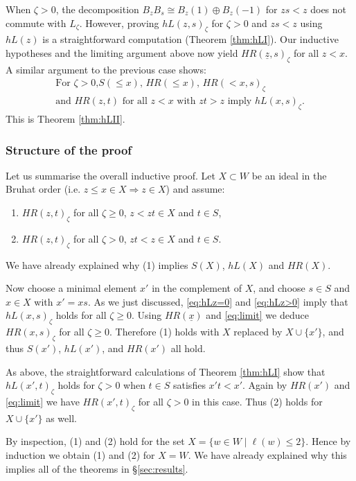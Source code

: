 \documentclass[11pt]{amsart}
\numberwithin{equation}{section}
\def\z{\zeta}
\def\un{\underline}
\theoremstyle{definition}
\theoremstyle{remark}
\begin{document}
When $\z>0$, the decomposition $B_z B_s \cong B_z(1) \oplus B_z(-1)$ for $zs < z$ does not commute with $L_\z$. However, proving $hL(z,s)_\z$ for
$\z>0$ and $zs < z$ using $hL(z)$ is a straightforward computation (Theorem \ref{thm:hLI}). Our inductive hypotheses and the limiting argument above
now yield $HR(\un{z},s)_\z$ for all $z<x$. A similar argument to the previous case shows: \begin{equation}\label{eq:hLz>0} \begin{array}{c}\text{For $\z>0$,
$S(\le\!x)$, $HR(\le\!x)$, $HR(<\! x,s)_\z$}\\\text{and $HR(z,t)$ for
all $z < x$ with $zt > z$ imply $hL(x,s)_\z$.} \end{array} \end{equation} This is Theorem \ref{thm:hLII}.

\subsubsection{Structure of the proof} \label{ss:sp}
Let us summarise the overall inductive proof. Let $X \subset W$ be an
ideal in the Bruhat order (i.e. $z \le x \in X \Rightarrow z \in X$) and assume:
\begin{enumerate}
\item $HR(z,t)_\z$ for all $\z \ge 0$, $z < zt \in X$ and $t \in S$,
\item $HR(z,t)_\z$ for all $\z > 0$, $zt < z \in X$ and $t \in S$.
\end{enumerate}
We have already explained why (1) implies $S(X)$, $hL(X)$ and $HR(X)$.

Now choose a minimal element $x'$ in the complement of $X$, and choose $s \in S$ and $x \in X$ with $x' = xs$. As we just discussed,
\eqref{eq:hLz=0} and \eqref{eq:hLz>0} imply that $hL(x,s)_\z$ holds for all $\z \ge 0$. Using $HR(\un{x})$ and \eqref{eq:limit} we deduce
$HR(x,s)_\z$ for all $\z \ge 0$. Therefore (1) holds with $X$ replaced by $X \cup \{x'\}$, and thus $S(x')$, $hL(x')$, and $HR(x')$ all hold.

As above, the straightforward calculations of Theorem \ref{thm:hLI} show that $hL(x',t)_\z$ holds for $\z>0$ when $t \in S$ satisfies $x't < x'$.
Again by $HR(x')$ and \eqref{eq:limit} we have $HR(x',t)_\z$ for all $\z>0$ in this case. Thus (2) holds for $X \cup \{x'\}$ as well.

By inspection, (1) and (2) hold for the set $X = \{w \in W \;| \;\ell(w) \le 2\}$. Hence by induction we obtain (1) and (2) for $X=W$. We have already
explained why this implies all of the theorems in \S\ref{sec:results}.
\end{document}
